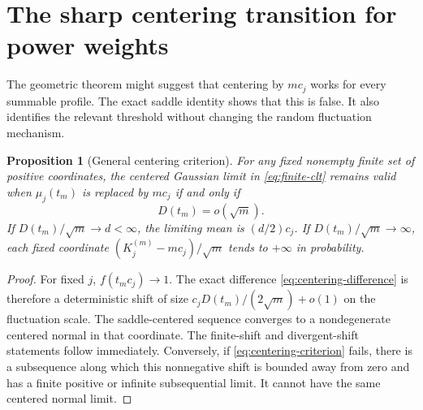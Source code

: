 \documentclass[11pt,a4paper]{article}
\numberwithin{equation}{section}
\newtheorem{proposition}[theorem]{Proposition}
\theoremstyle{definition}
\theoremstyle{remark}
\begin{document}
\section{The sharp centering transition for power weights}
\label{sec:power}

The geometric theorem might suggest that centering by $mc_j$ works for
every summable profile. The exact saddle identity shows that this is false.
It also identifies the relevant threshold without changing the random
fluctuation mechanism.

\begin{proposition}[General centering criterion]
\label{prop:centering-criterion}
For any fixed nonempty finite set of positive coordinates, the centered
Gaussian limit in \cref{eq:finite-clt} remains valid when
$\mu_j(t_m)$ is replaced by $mc_j$ if and only if
\begin{equation}
D(t_m)=o(\sqrt m).
\label{eq:centering-criterion}
\end{equation}
If $D(t_m)/\sqrt m\to d<\infty$, the limiting mean is
$(d/2)c_j$. If $D(t_m)/\sqrt m\to\infty$, each fixed coordinate
$(K_j^{(m)}-mc_j)/\sqrt m$ tends to $+\infty$ in probability.
\end{proposition}
\begin{proof}
For fixed $j$, $f(t_mc_j)\to1$. The exact difference
\cref{eq:centering-difference} is therefore a deterministic shift
of size $c_jD(t_m)/(2\sqrt m)+o(1)$ on the fluctuation scale.
The saddle-centered sequence converges to a nondegenerate centered
normal in that coordinate. The finite-shift and divergent-shift statements
follow immediately. Conversely, if \cref{eq:centering-criterion} fails,
there is a subsequence along which this nonnegative shift is bounded away
from zero and has a finite positive or infinite subsequential limit. It
cannot have the same centered normal limit.
\end{proof}
\end{document}
